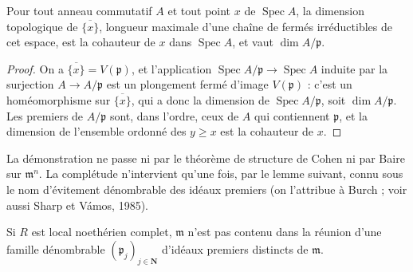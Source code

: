 \begin{lemme}\label{lem:100-adherence}
Pour tout anneau commutatif $A$ et tout point $x$ de $\operatorname{Spec} A$, la dimension topologique de $\overline{\{x\}}$, longueur maximale d'une chaîne de fermés irréductibles de cet espace, est la cohauteur de $x$ dans $\operatorname{Spec} A$, et vaut $\dim A/\mathfrak p$.
\end{lemme}
\begin{proof}
On a $\overline{\{x\}} = V(\mathfrak p)$, et l'application $\operatorname{Spec} A/\mathfrak p \to \operatorname{Spec} A$ induite par la surjection $A \to A/\mathfrak p$ est un plongement fermé d'image $V(\mathfrak p)$ : c'est un homéomorphisme sur $\overline{\{x\}}$, qui a donc la dimension de $\operatorname{Spec} A/\mathfrak p$, soit $\dim A/\mathfrak p$. Les premiers de $A/\mathfrak p$ sont, dans l'ordre, ceux de $A$ qui contiennent $\mathfrak p$, et la dimension de l'ensemble ordonné des $y \geq x$ est la cohauteur de $x$.
\end{proof}

La démonstration ne passe ni par le théorème de structure de Cohen ni par Baire sur $\mathfrak m^n$. La complétude n'intervient qu'une fois, par le lemme suivant, connu sous le nom d'évitement dénombrable des idéaux premiers (on l'attribue à Burch ; voir aussi Sharp et Vámos, 1985).

\begin{lemme}\label{lem:100-evitement}
Si $R$ est local noethérien complet, $\mathfrak m$ n'est pas contenu dans la réunion d'une famille dénombrable $(\mathfrak p_j)_{j \in \mathbf N}$ d'idéaux premiers distincts de $\mathfrak m$.
\end{lemme}

